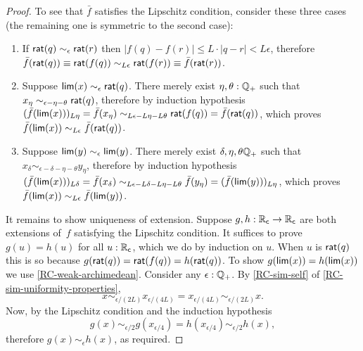 \begin{proof}
  To see that $\bar{f}$ satisfies the Lipschitz condition, consider these three cases (the
  remaining one is symmetric to the second case):
  \begin{enumerate}
  \item If $\mathsf{rat}(q) \sim_\epsilon \mathsf{rat}(r)$ then $|f(q) - f(r)| \leq L \cdot |q - r| <
    L \epsilon$, therefore $\bar{f}(\mathsf{rat}(q)) \equiv \mathsf{rat}(f(q)) \sim_{L \epsilon}
    \mathsf{rat}(f(r)) \equiv \bar{f}(\mathsf{rat}(r))$.
  \item Suppose $\mathsf{lim}(x) \sim_\epsilon \mathsf{rat}(q)$. There merely exist $\eta, \theta :
    \mathbb{Q}_{+}$ such that $x_\eta \sim_{\epsilon - \eta - \theta} \mathsf{rat}(q)$, therefore by
    induction hypothesis $(\bar{f}(\mathsf{lim}(x)))_{L \eta} = \bar{f}(x_\eta) \sim_{L \epsilon - L
      \eta - L \theta} \mathsf{rat}(f(q)) = \bar{f}(\mathsf{rat}(q))$, which proves
    $\bar{f}(\mathsf{lim}(x)) \sim_{L \epsilon} \bar{f}(\mathsf{rat}(q))$.
  \item Suppose $\mathsf{lim}(y) \sim_\epsilon \mathsf{lim}(y)$. There merely exist $\delta, \eta,
    \theta \mathbb{Q}_{+}$ such that $x_\delta \sim_{\epsilon - \delta - \eta - \theta} y_\eta$,
    therefore by induction hypothesis $(\bar{f}(\mathsf{lim}(x)))_{L \delta} = \bar{f}(x_\delta)
    \sim_{L \epsilon - L \delta - L \eta - L \theta} \bar{f}(y_\eta) =
    (\bar{f}(\mathsf{lim}(y)))_{L \eta}$, which proves $\bar{f}(\mathsf{lim}(x)) \sim_{L \epsilon}
    \bar{f}(\mathsf{lim}(y))$. 
  \end{enumerate}

  It remains to show uniqueness of extension. Suppose $g, h : \mathbb{R}_\mathsf{c} \to \mathbb{R}_\mathsf{c}$ are both
  extensions of~$f$ satisfying the Lipschitz condition. It suffices to prove $g(u) = h(u)$
  for all $u : \mathbb{R}_\mathsf{c}$, which we do by induction on $u$. When $u$ is $\mathsf{rat}(q)$ this is so
  because $g(\mathsf{rat}(q)) = \mathsf{rat}(f(q)) = h(\mathsf{rat}(q))$. To show $g(\mathsf{lim}(x)) =
  h(\mathsf{lim}(x))$ we use \autoref{RC-weak-archimedean}. Consider any $\epsilon : \mathbb{Q}_{+}$. By
  \autoref{RC-sim-self} of \autoref{RC-sim-uniformity-properties},
  \begin{equation*}
    x \sim_{\epsilon/(2 L)}
    x_{\epsilon/(4 L)} =
    x_{\epsilon/(4 L)} \sim_{\epsilon/(2 L)}
    x.
  \end{equation*}
  Now, by the Lipschitz condition and the induction hypothesis
  \begin{equation*}
    g(x) \sim_{\epsilon/2}
    g(x_{\epsilon/4}) =
    h(x_{\epsilon/4}) \sim_{\epsilon/2}
    h(x),
  \end{equation*}
  therefore $g(x) \sim_\epsilon h(x)$, as required.
\end{proof}



